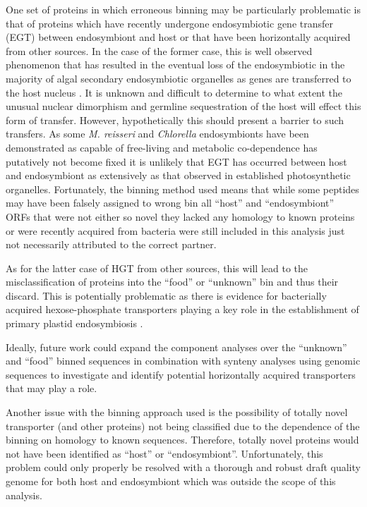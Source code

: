 One set of proteins in which erroneous binning may be particularly
problematic is that of proteins which have recently undergone endosymbiotic
gene transfer (EGT) between endosymbiont and host or that have been horizontally
acquired from other sources.  In the case of the former case,
this is well observed phenomenon that has resulted in the eventual loss
of the endosymbiotic in the majority of algal secondary endosymbiotic organelles
as genes are transferred to the host nucleus
\citep{Keeling2008a,Archibald2005,Keeling2004a}.
It is unknown and difficult to determine to what extent the 
unusual nuclear dimorphism and germline sequestration of the host 
will effect this form of transfer. However, hypothetically this should
present a barrier to such transfers. 
As some \textit{M. reisseri} and \textit{Chlorella} endosymbionts 
have been demonstrated as capable of free-living and metabolic
co-dependence has putatively not become fixed it is 
unlikely that EGT has occurred between host and endosymbiont as extensively
as that observed in established photosynthetic organelles. 
Fortunately, the binning method used means that while some peptides
may have been falsely assigned to wrong bin all ``host'' and
``endosymbiont'' ORFs that were not either so novel they lacked
any homology to known proteins or were recently acquired from
bacteria were still included in this analysis just not necessarily
attributed to the correct partner.

As for the latter case of HGT from other sources, this will lead to the misclassification
of proteins into the ``food'' or ``unknown'' bin and thus their discard. 
This is potentially problematic as there is evidence for bacterially acquired 
hexose-phosphate transporters playing a key role in the 
establishment of primary plastid endosymbiosis \citep{Price2012,Karkar2015a}.

Ideally, future work could expand the component analyses over the 
``unknown'' and ``food'' binned sequences in combination with synteny
analyses using genomic sequences to investigate and identify
potential horizontally acquired transporters that may play a role.

Another issue with the binning approach used is the possibility
of totally novel transporter (and other proteins) not being classified
due to the dependence of the binning on homology to known sequences.
Therefore, totally novel proteins would not have been identified as 
``host'' or ``endosymbiont''.  Unfortunately, this problem 
could only properly be resolved with a thorough and robust 
draft quality genome for both host and endosymbiont which was outside
the scope of this analysis. 



